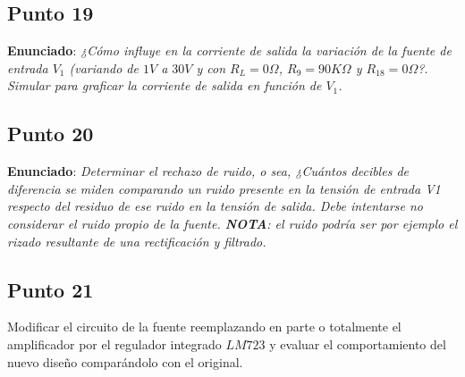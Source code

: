 \subsection{Punto 19}

\textbf{Enunciado}: \textsl{¿Cómo influye en la corriente de salida la variación de la fuente de entrada $V_{1}$ (variando de $1 V$ a $30 V$ y con $R_{L} = 0 \Omega$, $R_{9} = 90 K\Omega$ y $R_{18} = 0 \Omega$?. Simular para graficar la corriente de salida en función de $V_{1}$.}\\




\subsection{Punto 20}

\textbf{Enunciado}: \textsl{Determinar el rechazo de ruido, o sea, ¿Cuántos decibles de diferencia se miden comparando un ruido presente en la tensión de entrada V1 respecto del residuo de ese ruido en la tensión de salida. Debe intentarse no considerar el ruido propio de la fuente. \textbf{NOTA}: el ruido podría ser por ejemplo el rizado resultante de una rectificación y filtrado.}\\





\clearpage

\subsection{Punto 21}

Modificar el circuito de la fuente reemplazando en parte o totalmente el amplificador por el regulador integrado $LM723$ y evaluar el comportamiento del nuevo diseño comparándolo con el original.

\clearpage


